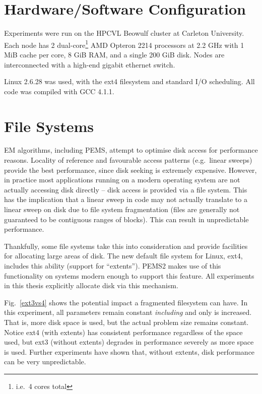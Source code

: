 \documentclass[12pt]{carletoncsthesis}
\begin{document}
\section{Hardware/Software Configuration}
\label{setup}


Experiments were run on the HPCVL Beowulf cluster at Carleton University.
Each node has 2 dual-core\footnote{i.e.\ 4 cores total} AMD Opteron 2214
processors at 2.2 GHz with 1 MiB cache per core, 8 GiB RAM, and a single 200
GiB disk.  Nodes are interconnected with a high-end gigabit ethernet switch.

Linux 2.6.28 was used, with the ext4 filesystem and standard I/O scheduling.
All code was compiled with GCC 4.1.1.

\section{File Systems}
\label{filesystems}


EM algorithms, including PEMS, attempt to optimise disk access for
performance reasons.  Locality of reference and favourable access patterns
(e.g.\ linear sweeps) provide the best performance, since disk seeking
is extremely expensive.  However, in practice most applications running
on a modern operating system are not actually accessing disk directly --
disk access is provided via a file system.  This has the implication that
a linear sweep in code may not actually translate to a linear sweep on disk
due to file system fragmentation (files are generally not guaranteed to be
contiguous ranges of blocks).  This can result in unpredictable performance.

Thankfully, some file systems take this into consideration and provide
facilities for allocating large areas of disk.  The new default file system
for Linux, ext4, includes this ability (support for ``extents'').  PEMS2 makes
use of this functionality on systems modern enough to support this feature.
All experiments in this thesis explicitly allocate disk via this mechanism.

Fig.~\ref{ext3vs4} shows the potential impact a fragmented filesystem can have.
In this experiment, all parameters remain constant {\em including } and
only  is increased.  That is, more disk space is used, but the actual
problem size remains constant.  Notice ext4 (with extents) has consistent
performance regardless of the space used, but ext3 (without extents) degrades
in performance severely as more space is used.  Further experiments have shown
that, without extents, disk performance can be very unpredictable.
\end{document}
